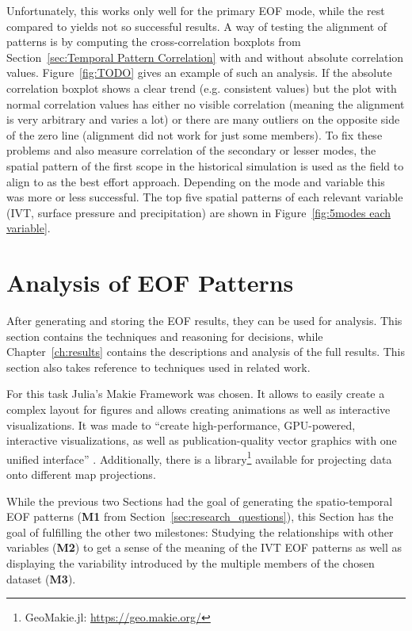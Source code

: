 Unfortunately, this works only well for the primary EOF mode, while the rest compared to yields not so successful results. 
A way of testing the alignment of patterns is by computing the cross-correlation boxplots from Section~\ref{sec:Temporal Pattern Correlation} with and without absolute correlation values.
Figure~\ref{fig:TODO} gives an example of such an analysis. 
If the absolute correlation boxplot shows a clear trend (e.g. consistent values) but the plot with normal correlation values has either no visible correlation (meaning the alignment is very arbitrary and varies a lot) or there are many outliers on the opposite side of the zero line (alignment did not work for just some members). 
To fix these problems and also measure correlation of the secondary or lesser modes, the spatial pattern of the first scope in the historical simulation is used as the field to align to as the best effort approach. Depending on the mode and variable this was more or less successful. 
The top five spatial patterns of each relevant variable (IVT, surface pressure and precipitation) are shown in Figure~\ref{fig:5modes each variable}.



\section{Analysis of EOF Patterns}
\label{sec:vis_analysis}

After generating and storing the EOF results, they can be used for analysis. 
This section contains the techniques and reasoning for decisions, while Chapter~\ref{ch:results} contains the descriptions and analysis of the full results. 
This section also takes reference to techniques used in related work. 

For this task Julia's Makie Framework \cite{danisch_makiejl_2021} was chosen. 
It allows to easily create a complex layout for figures and allows creating animations as well as interactive visualizations. 
It was made to \enquote{create high-performance, GPU-powered, interactive visualizations, as well as publication-quality vector graphics with one unified interface} \cite{danisch_makiejl_2021}. 
Additionally, there is a library\footnote{GeoMakie.jl: \url{https://geo.makie.org/}} available for projecting data onto different map projections. 


While the previous two Sections had the goal of generating the spatio-temporal EOF patterns (\textbf{M1} from Section~\ref{sec:research_questions}), this Section has the goal of fulfilling the other two milestones:  
Studying the relationships with other variables (\textbf{M2}) to get a sense of the meaning of the IVT EOF patterns as well as displaying the variability introduced by the multiple members of the chosen dataset (\textbf{M3}). 

